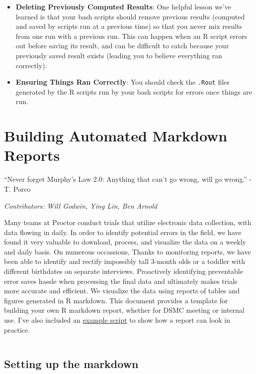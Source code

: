\documentclass[
]{book}
\begin{document}
\begin{itemize}
\item
  \textbf{Deleting Previously Computed Results}: One helpful lesson we've learned is that your bash scripts should remove previous results (computed and saved by scripts run at a previous time) so that you never mix results from one run with a previous run. This can happen when an R script errors out before saving its result, and can be difficult to catch because your previously saved result exists (leading you to believe everything ran correctly).
\item
  \textbf{Ensuring Things Ran Correctly}: You should check the \texttt{.Rout} files generated by the R scripts run by your bash scripts for errors once things are run.
\end{itemize}

\hypertarget{building-automated-markdown-reports}{%
\chapter{Building Automated Markdown Reports}\label{building-automated-markdown-reports}}

``Never forget Murphy's Law 2.0: Anything that can't go wrong, will go wrong.'' -T. Porco

\emph{Contributors: Will Godwin, Ying Lin, Ben Arnold}

Many teams at Proctor conduct trials that utilize electronic data collection, with data flowing in daily. In order to identify potential errors in the field, we have found it very valuable to download, process, and visualize the data on a weekly and daily basis. On numerous occassions, Thanks to monitoring reports, we have been able to identify and rectify impossibly tall 3-month olds or a toddler with different birthdates on separate interviews. Proactively identifying preventable error saves hassle when processing the final data and ultimately makes trials more accurate and efficient. We visualize the data using reports of tables and figures generated in R markdown. This document provides a template for building your own R markdown report, whether for DSMC meeting or internal use. I've also included an \href{templates/example_report.Rmd}{example script} to show how a report can look in practice.

\(~\)

\hypertarget{setting-up-the-markdown}{%
\section{Setting up the markdown}\label{setting-up-the-markdown}}
\end{document}
